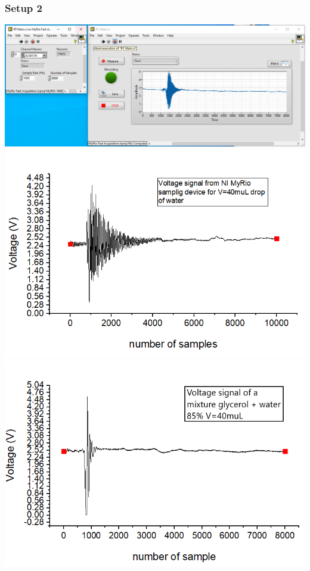 \documentclass[xcolor=table]{beamer}
\begin{document}
\begin{frame}
\frametitle{Setup 2}
	\fontsize{8}{10.2} \selectfont
	\includegraphics[width=.8\columnwidth]{Labview_programme.PNG}\\
	\includegraphics[width=.5\columnwidth]{voltagesignal.PNG}
	\includegraphics[width=.5\columnwidth]{voltaggio8540muL.PNG}\\ 
\end{frame}
\end{document}
